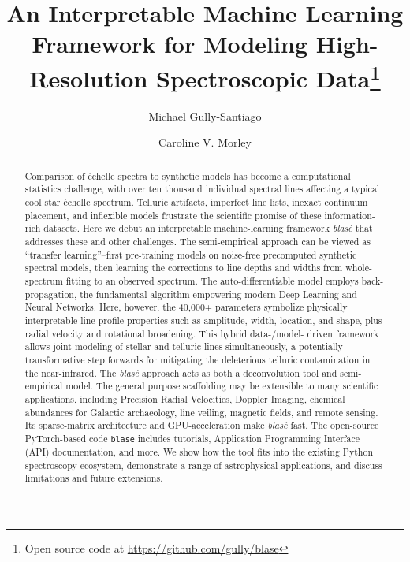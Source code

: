 \documentclass[twocolumn]{aastex631}
\begin{document}
\title{An Interpretable Machine Learning Framework for Modeling High-Resolution Spectroscopic Data\footnote{Open source code at \url{https://github.com/gully/blase}}}

\author{Michael Gully-Santiago}

\author{Caroline V. Morley}

\begin{abstract}

    Comparison of \'echelle spectra to synthetic models has become a computational statistics challenge, with over ten thousand individual spectral lines affecting a typical cool star \'echelle spectrum.  Telluric artifacts, imperfect line lists, inexact continuum placement, and inflexible models frustrate the scientific promise of these information-rich datasets.  Here we debut an interpretable machine-learning framework \emph{blas\'e} that addresses these and other challenges.  The semi-empirical approach can be viewed as ``transfer learning''--first pre-training models on noise-free precomputed synthetic spectral models, then learning the corrections to line depths and widths from whole-spectrum fitting to an observed spectrum.  The auto-differentiable model employs back-propagation, the fundamental algorithm empowering modern Deep Learning and Neural Networks. Here, however, the 40,000+ parameters symbolize physically interpretable line profile properties such as amplitude, width, location, and shape, plus radial velocity and rotational broadening.  This hybrid data-/model- driven framework allows joint modeling of stellar and telluric lines simultaneously, a potentially transformative step forwards for mitigating the deleterious telluric contamination in the near-infrared.  The \emph{blas\'e} approach acts as both a deconvolution tool and semi-empirical model. The general purpose scaffolding may be extensible to many scientific applications, including Precision Radial Velocities, Doppler Imaging, chemical abundances for Galactic archaeology, line veiling, magnetic fields, and remote sensing.  Its sparse-matrix architecture and GPU-acceleration make \emph{blas\'e} fast.  The open-source PyTorch-based code \texttt{blase} includes tutorials, Application Programming Interface (API) documentation, and more.  We show how the tool fits into the existing Python spectroscopy ecosystem, demonstrate a range of astrophysical applications, and discuss limitations and future extensions.


\end{abstract}
\end{document}

